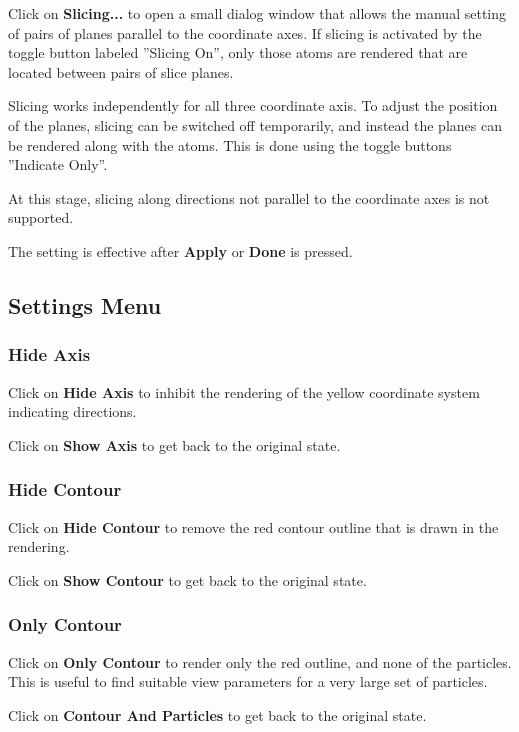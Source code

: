 \documentclass[11pt]{article}
\begin{document}
Click on {\bf Slicing...} to open a small dialog window that allows the manual
setting of pairs of planes parallel to the coordinate axes.  If slicing is
activated by the toggle button labeled ''Slicing On'', only those atoms are
rendered that are located between pairs of slice planes. 

Slicing works independently for all three coordinate axis.   To adjust the
position of the planes, slicing can be switched off temporarily, and instead
the planes can be rendered along with the atoms.  This is done using the toggle
buttons ''Indicate Only''.    

At this stage, slicing along directions not parallel to the coordinate axes is
not supported.

The setting is effective after {\bf Apply} or {\bf Done} is pressed.
 
\subsection{Settings Menu}

\subsubsection{Hide Axis}

Click on {\bf Hide Axis} to inhibit the rendering of the yellow coordinate
system indicating directions. 

Click on {\bf Show Axis} to get back to the original state.  

\subsubsection{Hide Contour}

Click on {\bf Hide Contour} to remove the red contour outline that is 
drawn in the rendering.

Click on {\bf Show Contour} to get back to the original state.  

\subsubsection{Only Contour}

Click on {\bf Only Contour} to render only the red outline, and none 
of the particles.  This is useful to find suitable view parameters for a 
very large set of particles.

Click on {\bf Contour And Particles} to get back to the original state.  
\end{document}
